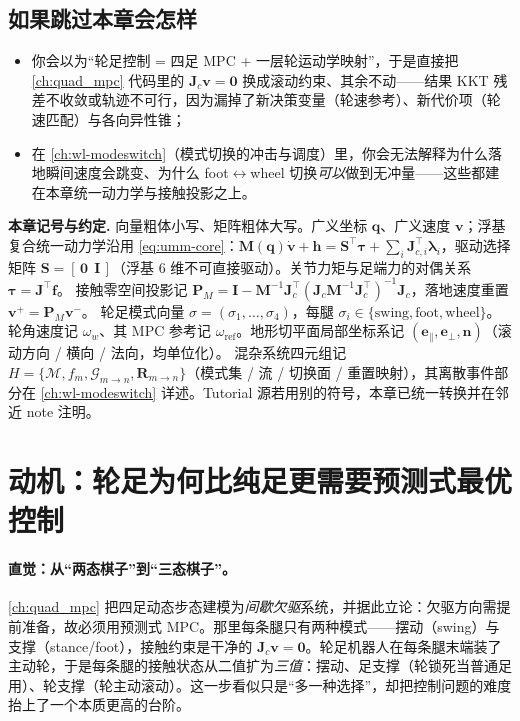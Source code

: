 \subsection*{如果跳过本章会怎样}
\begin{itemize}
  \item 你会以为“轮足控制 = 四足 MPC + 一层轮运动学映射”，于是直接把 \cref{ch:quad_mpc} 代码里的 $\mathbf{J}_c\mathbf{v}=\mathbf{0}$ 换成滚动约束、其余不动——结果 KKT 残差不收敛或轨迹不可行，因为漏掉了新决策变量（轮速参考）、新代价项（轮速匹配）与各向异性锥；
  \item 在 \cref{ch:wl-modeswitch}（模式切换的冲击与调度）里，你会无法解释为什么落地瞬间速度会跳变、为什么 foot$\leftrightarrow$wheel 切换\emph{可以}做到无冲量——这些都建在本章统一动力学与接触投影之上。
\end{itemize}

\begin{note}
\textbf{本章记号与约定.}\;
向量粗体小写、矩阵粗体大写。广义坐标 $\mathbf{q}$、广义速度 $\mathbf{v}$；浮基复合统一动力学沿用 \cref{eq:umm-core}：$\mathbf{M}(\mathbf{q})\dot{\mathbf{v}}+\mathbf{h}=\mathbf{S}^\top\boldsymbol\tau+\sum_{i}\mathbf{J}_{c,i}^\top\boldsymbol\lambda_i$，驱动选择矩阵 $\mathbf{S}=[\,\mathbf{0}\ \ \mathbf{I}\,]$（浮基 $6$ 维不可直接驱动）。关节力矩与足端力的对偶关系 $\boldsymbol\tau=\mathbf{J}^\top\mathbf{f}$。
接触零空间投影记 $\mathbf{P}_M=\mathbf{I}-\mathbf{M}^{-1}\mathbf{J}_c^\top(\mathbf{J}_c\mathbf{M}^{-1}\mathbf{J}_c^\top)^{-1}\mathbf{J}_c$，落地速度重置 $\mathbf{v}^+=\mathbf{P}_M\mathbf{v}^-$。
轮足模式向量 $\sigma=(\sigma_1,\dots,\sigma_4)$，每腿 $\sigma_i\in\{\mathrm{swing},\mathrm{foot},\mathrm{wheel}\}$。
轮角速度记 $\omega_w$、其 MPC 参考记 $\omega_{\mathrm{ref}}$。地形切平面局部坐标系记 $(\mathbf{e}_\parallel,\mathbf{e}_\perp,\mathbf{n})$（滚动方向 / 横向 / 法向，均单位化）。
混杂系统四元组记 $H=\{\mathcal{M},f_m,\mathcal{G}_{m\to n},\mathbf{R}_{m\to n}\}$（模式集 / 流 / 切换面 / 重置映射），其离散事件部分在 \cref{ch:wl-modeswitch} 详述。Tutorial 源若用别的符号，本章已统一转换并在邻近 note 注明。
\end{note}

\section{动机：轮足为何比纯足更需要预测式最优控制}
\label{sec:wl-motiv}

\paragraph{直觉：从“两态棋子”到“三态棋子”。}
\cref{ch:quad_mpc} 把四足动态步态建模为\emph{间歇欠驱}系统，并据此立论：欠驱方向需提前准备，故必须用预测式 MPC。那里每条腿只有两种模式——摆动（swing）与支撑（stance/foot），接触约束是干净的 $\mathbf{J}_c\mathbf{v}=\mathbf{0}$。轮足机器人在每条腿末端装了主动轮，于是每条腿的接触状态从二值扩为\emph{三值}：摆动、足支撑（轮锁死当普通足用）、轮支撑（轮主动滚动）。这一步看似只是“多一种选择”，却把控制问题的难度抬上了一个本质更高的台阶。

